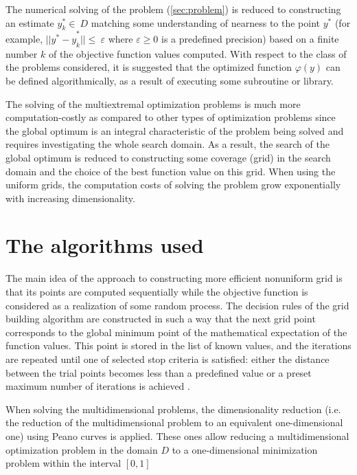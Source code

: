 \documentclass{svproc}
\begin{document}
The numerical solving of the problem (\ref{sec:problem})  is reduced to constructing an estimate  $ y_k^\ast\in\ D$ matching some understanding of nearness to the point $y^\ast$ (for example,  ${||y^\ast-y}_k^\ast||\le\ \varepsilon$ where $\varepsilon\geq0$ is a predefined precision) based on a  finite number $k$ of the objective function values computed. With respect to the class of the problems  considered, it is suggested that the optimized function $\varphi(y)$ can be defined algorithmically, as  a result of executing some subroutine or library.

The solving of the multiextremal optimization problems is much more computation-costly  as compared  to other types of optimization problems since the global optimum is an integral characteristic of the  problem being solved and requires investigating the whole search domain. As a result, the search of the  global optimum is reduced to constructing some coverage (grid) in the search domain and the choice of  the best function value on this grid. When using the uniform grids, the computation costs of solving the  problem grow exponentially with increasing dimensionality.



\section{The algorithms used}\label{SecA}

The main idea of the approach to constructing more efficient nonuniform grid is that its points are  computed sequentially while the objective function is considered as a realization of some random  process. The decision rules of the grid building algorithm are constructed in such a way that the next  grid point corresponds to the global minimum point of the mathematical expectation of the function  values. This point is stored in the list of known values, and the iterations are repeated until one of  selected stop criteria is satisfied: either the distance between the trial points becomes less than a  predefined value or a preset maximum number of iterations is achieved \cite{fio_bib10}.

When solving the multidimensional problems, the dimensionality reduction (i.e. the reduction of the  multidimensional problem to an equivalent one-dimensional one) using Peano curves is applied. These  ones allow reducing a multidimensional optimization problem in the domain $D$  to a one-dimensional  minimization problem within the interval $[0, 1]$
\end{document}
